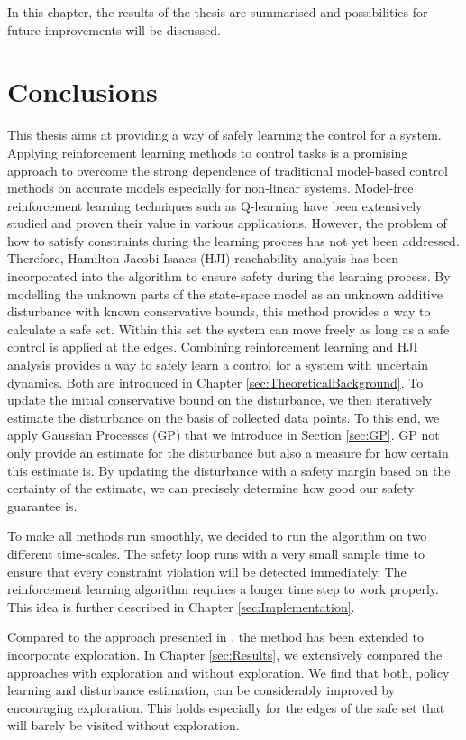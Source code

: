 \documentclass[../main.tex]{subfiles}
\begin{document}
In this chapter, the results of the thesis are summarised and possibilities for future improvements will be discussed. 
\section{Conclusions}
This thesis aims at providing a way of safely learning the control for a system. Applying reinforcement learning methods to control tasks is a promising approach to overcome the strong dependence of traditional model-based control methods on accurate models especially for non-linear systems. Model-free reinforcement learning techniques such as Q-learning have been extensively studied and proven their value in various applications. However, the problem of how to satisfy constraints during the learning process has not yet been addressed. Therefore, Hamilton-Jacobi-Isaacs (HJI) reachability analysis has been incorporated into the algorithm to ensure safety during the learning process. By modelling the unknown parts of the state-space model as an unknown additive disturbance with known conservative bounds, this method provides a way to calculate a safe set. Within this set the system can move freely as long as a safe control is applied at the edges. Combining reinforcement learning and HJI analysis provides a way to safely learn a control for a system with uncertain dynamics. Both are introduced in Chapter \ref{sec:TheoreticalBackground}. To update the initial conservative bound on the disturbance, we then iteratively estimate the disturbance on the basis of collected data points. To this end, we apply Gaussian Processes (GP) that we introduce in Section \ref{sec:GP}. GP not only provide an estimate for the disturbance but also a measure for how certain this estimate is. By updating the disturbance with a safety margin based on the certainty of the estimate, we can precisely determine how good our safety guarantee is. \par
To make all methods run smoothly, we decided to run the algorithm on two different time-scales. The safety loop runs with a very small sample time to ensure that every constraint violation will be detected immediately. The reinforcement learning algorithm requires a longer time step to work properly. This idea is further described in Chapter \ref{sec:Implementation}.\par

Compared to the approach presented in \cite{akametalu2014reachability}, the method has been extended to incorporate exploration. In Chapter \ref{sec:Results}, we extensively compared the approaches with exploration and without exploration. We find that both, policy learning and disturbance estimation, can be considerably improved by encouraging exploration. This holds especially for the edges of the safe set that will barely be visited without exploration. 
\end{document}
